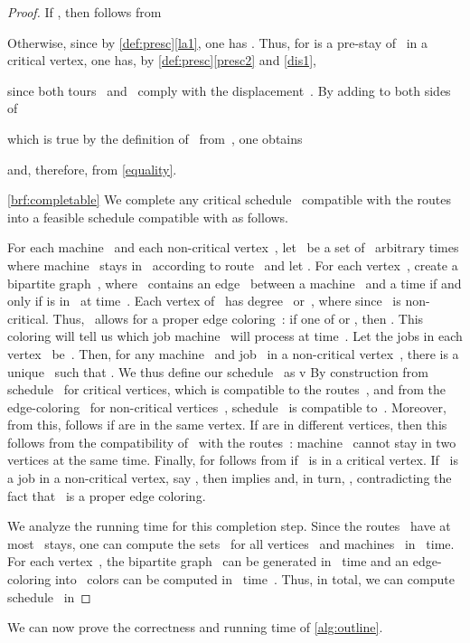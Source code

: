 \documentclass[natbib,sort,smallextended,envcountsame,envcountsect,numbook]{svjour3}
\begin{document}
\begin{proof}
If , then  follows from

Otherwise, since  by \cref{def:presc}\eqref{la1}, one has .  Thus, for  is a pre-stay of~ in a critical vertex,  one has, by \cref{def:presc}\eqref{presc2} and \eqref{dis1},

since both tours~ and~
comply with the displacement~.  
By adding  to both sides of

which is true by the definition of~ from~, one obtains

and, therefore,   from \eqref{equality}.


\eqref{brf:completable}
We complete any critical schedule~ compatible
with the routes~ into a feasible schedule
compatible with  as follows.

For each machine~
and each non-critical vertex~,
let ~be a set of ~arbitrary times
where machine~ stays in~ according to
route~ and let .
For each vertex~, create a bipartite
graph~,
where ~contains an edge~ between a machine~ and a time 
if and only if  is in~ at time~.
Each vertex of~ has degree~ or~, where 
since ~is non-critical.
Thus, ~allows for a proper edge coloring~:
if one of  or , then .
This coloring will tell us which job machine~ will process at time~.
Let the jobs in each vertex~
be~.
Then, for any machine~ and job~
in a non-critical vertex~,
there is a unique~ such that .
We thus define our schedule~ as
v
By construction from schedule~ for critical vertices,
which is compatible to the routes~,
and
from the edge-coloring~ for non-critical vertices~,
schedule ~is compatible to~.
Moreover, from this, 
follows if  are in the same vertex.
If  are in different vertices,
then this follows from the compatibility of~
with the routes~: machine~
cannot stay in two vertices at the same time.
Finally,  for 
follows from  if ~is in a critical vertex.
If ~is a job in a non-critical vertex, say ,
then  implies  and,
in turn, ,
contradicting the fact that ~is a proper edge coloring.

We analyze the running time for this completion step.
Since the routes~ have at most
~stays, one can compute the sets~
for all vertices~ and machines~ in
~time.
For each vertex~,
the bipartite graph~ can be generated
in ~time and an edge-coloring into ~colors
can be computed in ~time~\citep{COS01}.
Thus, in total,
we can compute schedule~ in

\end{proof}

\noindent
We can now prove the correctness and running time of \cref{alg:outline}.
\end{document}
